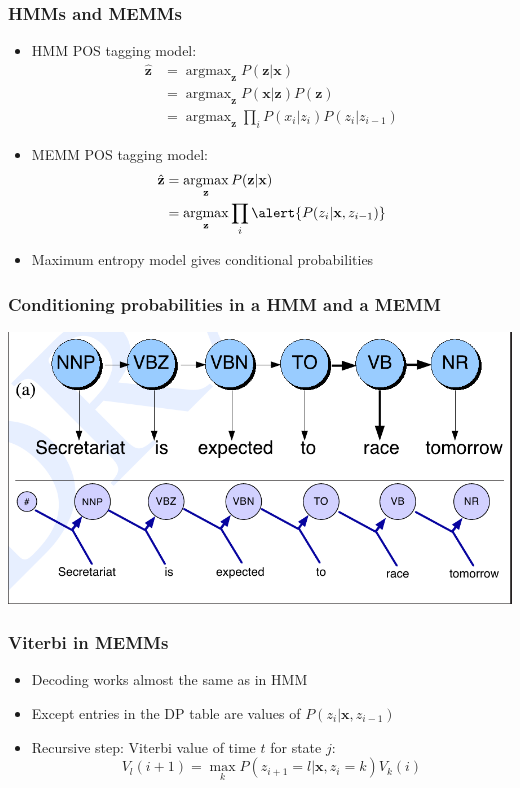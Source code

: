 \documentclass[usenames,dvipsnames]{beamer}
\DeclareMathOperator*{\argmax}{argmax}
\newcommand{\x}{\mathbf{x}}
\newcommand{\z}{\mathbf{z}}
\begin{document}
\begin{frame}
  \frametitle{HMMs and MEMMs}
  \begin{itemize}
  \item HMM POS tagging model:
    \begin{align*}
      \hat{\z} & = \argmax_\z P(\z|\x) \\
      & = \argmax_\z P(\x|\z)P(\z)\\
      & = \argmax_\z \prod_i P(x_i|z_i) P(z_i|z_{i-1})
\end{align*}
\item MEMM POS tagging model:
\begin{align*}
 \hat{\z} & = \argmax_\z P(\z|\x) \\
	 & = \argmax_\z \prod_i \alert{P(z_i|\x,z_{i-1})}
\end{align*}
\item Maximum entropy model gives conditional probabilities
\end{itemize}
\end{frame}

\begin{frame}\frametitle{Conditioning probabilities in a HMM and a
    MEMM}
 \begin{center}
 \includegraphics[scale=0.3]{hmm-memm.png}
\end{center}
\end{frame}


\begin{frame}
 \frametitle{Viterbi in MEMMs}
 \begin{itemize}
 \item Decoding works almost the same as in HMM
 \item Except entries in the DP table are values of
   $P(z_i|\x,z_{i-1})$
 \item Recursive step: Viterbi value of time $t$ for state $j$:
   \begin{equation*}
     V_l(i+1) = \max_k P(z_{i+1}=l|\x,z_i = k) V_k(i)
   \end{equation*}
 \end{itemize}
\end{frame}
\end{document}
